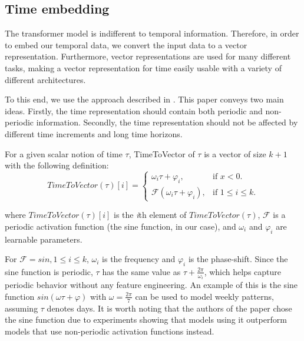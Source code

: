 \subsection{Time embedding}\label{sec:time2vec}
The transformer model is indifferent to temporal information.
Therefore, in order to embed our temporal data, we convert the input data to a vector representation.
Furthermore, vector representations are used for many different tasks, making a vector representation for time easily usable with a variety of different architectures.

To this end, we use the approach described in \citet{time2vec}. 
This paper conveys two main ideas.
Firstly, the time representation should contain both periodic and non-periodic information.
Secondly, the time representation should not be affected by different time increments and long time horizons.  

For a given scalar notion of time $\tau$, TimeToVector of $\tau$ is a vector of size $k + 1$ with the following definition:
$$
TimeToVector(\tau)[i] = 
\begin{cases}
  \omega_i \tau + \varphi_i, & \mbox{if $x<0$}.\\
  \mathcal{F}(\omega_i \tau + \varphi_i), & \mbox{if $1 \le i \le k$}.
\end{cases}
$$

where $TimeToVector(\tau)[i]$ is the \textit{i}th element of $TimeToVector(\tau)$, $\mathcal{F}$ is a periodic activation function (the sine function, in our case), and $\omega_i$ and $\varphi_i$ are learnable parameters. 

For $\mathcal{F} = sin, 1 \leq i \leq k$, $\omega_i$ is the frequency and $\varphi_i$ is the phase-shift.
Since the sine function is periodic, $\tau$ has the same value as $\tau + \frac{2\pi}{\omega_i}$, which helps capture periodic behavior without any feature engineering.
An example of this is the sine function $sin(\omega\tau + \varphi)$ with $\omega = \frac{2\pi}{7}$ can be used to model weekly patterns, assuming $\tau$ denotes days.
It is worth noting that the authors of the paper chose the sine function due to experiments showing that models using it outperform models that use non-periodic activation functions instead.\cite{time2vec}
